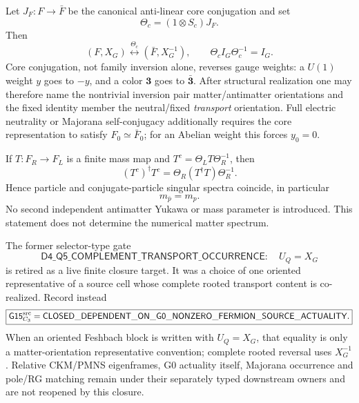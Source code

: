 \documentclass[12pt,a4paper]{article}
\begin{document}
\begin{corollary}
\label{p5:cor:v381-geometric-conjugation}
Let \(J_F:F\to\bar F\) be the canonical anti-linear core conjugation and set
\[
 \Theta_c=(1\otimes S_c)J_F.
\]
Then
\[
 \boxed{(F,X_G)\stackrel{\Theta_c}{\longleftrightarrow}
 (\bar F,X_G^{-1})},
 \qquad
 \Theta_c I_G\Theta_c^{-1}=I_G.
\]
Core conjugation, not family inversion alone, reverses gauge weights: a
\(U(1)\) weight \(y\) goes to \(-y\), and a color \(\mathbf3\) goes to
\(\bar{\mathbf3}\).  After structural realization one may therefore name the
nontrivial inversion pair matter/antimatter orientations and the fixed
identity member the neutral/fixed \emph{transport} orientation.  Full electric
neutrality or Majorana self-conjugacy additionally requires the core
representation to satisfy \(F_0\simeq\bar F_0\); for an Abelian weight this
forces \(y_0=0\).
\end{corollary}

\begin{corollary}
\label{p5:cor:v381-conjugate-mass-spectrum}
If \(T:F_R\to F_L\) is a finite mass map and
\(T^c=\Theta_LT\Theta_R^{-1}\), then
\[
 (T^c)^\dagger T^c
 =\Theta_R(T^\dagger T)\Theta_R^{-1}.
\]
Hence particle and conjugate-particle singular spectra coincide, in particular
\[
 \boxed{m_{\bar p}=m_p}.
\]
No second independent antimatter Yukawa or mass parameter is introduced.
This statement does not determine the numerical matter spectrum.
\end{corollary}

\begin{corollary}
\label{p5:cor:v381-g15-transport-closed}
The former selector-type gate
\[
 \mathsf{D4\_Q5\_COMPLEMENT\_TRANSPORT\_OCCURRENCE}:\quad U_Q=X_G
\]
is retired as a live finite closure target.  It was a choice of one oriented
representative of a source cell whose complete rooted transport content is
co-realized.  Record instead
\[
 \boxed{\mathsf{G15}_{C_3}^{\rm src}
 =\mathsf{CLOSED\_DEPENDENT\_ON\_G0\_NONZERO\_FERMION\_SOURCE\_ACTUALITY}.}
\]
When an oriented Feshbach block is written with \(U_Q=X_G\), that equality is
only a matter-orientation representative convention; complete rooted reversal
uses \(X_G^{-1}\).  Relative CKM/PMNS eigenframes, G0 actuality itself,
Majorana occurrence and pole/RG matching remain under their separately typed
downstream owners and are not reopened by this closure.
\end{corollary}
\end{document}
